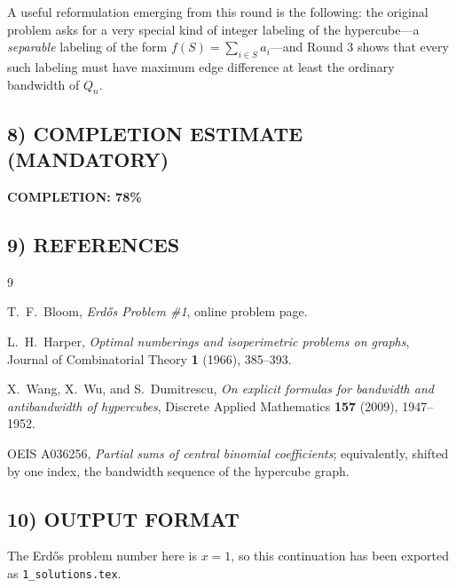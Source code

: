 A useful reformulation emerging from this round is the following: the original problem asks for a very special kind of integer labeling of the hypercube---a \emph{separable} labeling of the form $f(S)=\sum_{i\in S} a_i$---and Round 3 shows that every such labeling must have maximum edge difference at least the ordinary bandwidth of $Q_n$.

\subsection{8) COMPLETION ESTIMATE (MANDATORY)}

\noindent\textbf{COMPLETION: 78\%}

\subsection{9) REFERENCES}

\begin{thebibliography}{9}

T.~F.~Bloom,
\emph{Erd\H{o}s Problem \#1}, online problem page.

L.~H.~Harper,
\emph{Optimal numberings and isoperimetric problems on graphs},
Journal of Combinatorial Theory \textbf{1} (1966), 385--393.

X.~Wang, X.~Wu, and S.~Dumitrescu,
\emph{On explicit formulas for bandwidth and antibandwidth of hypercubes},
Discrete Applied Mathematics \textbf{157} (2009), 1947--1952.

OEIS A036256,
\emph{Partial sums of central binomial coefficients}; equivalently, shifted by one index, the bandwidth sequence of the hypercube graph.

\end{thebibliography}

\subsection{10) OUTPUT FORMAT}

The Erd\H{o}s problem number here is $x=1$, so this continuation has been exported as \texttt{1\_solutions.tex}.
